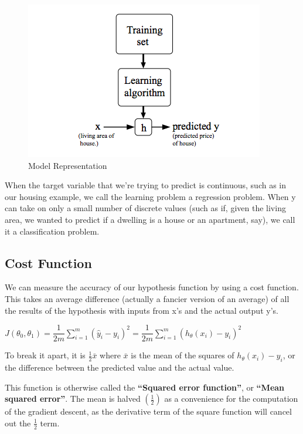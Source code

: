 \documentclass[
]{article}
\begin{document}
\begin{figure}
\centering
\includegraphics{Model_representation.png}
\caption{Model Representation}
\end{figure}

When the target variable that we're trying to predict is continuous,
such as in our housing example, we call the learning problem a
regression problem. When y can take on only a small number of discrete
values (such as if, given the living area, we wanted to predict if a
dwelling is a house or an apartment, say), we call it a classification
problem.

\hypertarget{cost-function}{%
\subsection{Cost Function}\label{cost-function}}

We can measure the accuracy of our hypothesis function by using a cost
function. This takes an average difference (actually a fancier version
of an average) of all the results of the hypothesis with inputs from x's
and the actual output y's.

\(J(\theta_0, \theta_1) = \dfrac {1}{2m} \displaystyle \sum _{i=1}^m \left ( \hat{y}_{i}- y_{i} \right)^2 = \dfrac {1}{2m} \displaystyle \sum _{i=1}^m \left (h_\theta (x_{i}) - y_{i} \right)^2\)

To break it apart, it is \(\frac{1}{2} \bar{x}\) where \(\bar{x}\) is
the mean of the squares of \(h_\theta (x_{i}) - y_{i}\), or the
difference between the predicted value and the actual value.

This function is otherwise called the \textbf{``Squared error
function''}, or \textbf{``Mean squared error''}. The mean is halved
\(\left(\frac{1}{2}\right)\) as a convenience for the computation of the
gradient descent, as the derivative term of the square function will
cancel out the \(\frac{1}{2}\) term.
\end{document}
